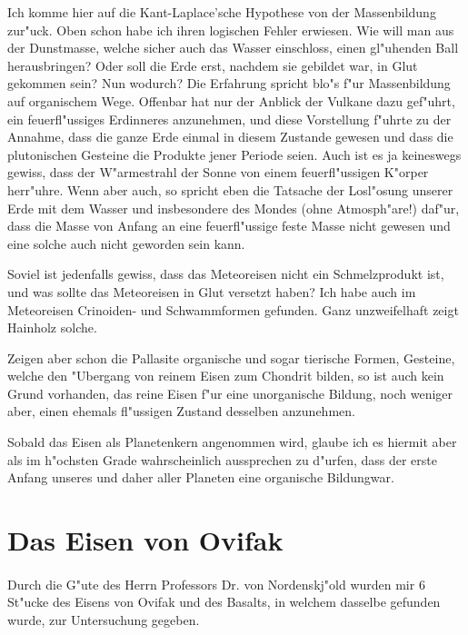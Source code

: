 \documentclass[a4paper, 11pt, oneside]{article}
\begin{document}
Ich komme hier auf die Kant-Laplace'sche Hypothese von der Massenbildung zur"uck. Oben schon habe ich ihren logischen Fehler erwiesen. Wie will man aus der Dunstmasse, welche sicher auch das Wasser einschloss, einen gl"uhenden Ball herausbringen? Oder soll die Erde erst, nachdem sie gebildet war, in Glut gekommen sein? Nun wodurch? Die Erfahrung spricht blo"s f"ur Massenbildung auf organischem Wege. Offenbar hat nur der Anblick der Vulkane dazu gef"uhrt, ein feuerfl"ussiges Erdinneres anzunehmen, und diese Vorstellung f"uhrte zu der Annahme, dass die ganze Erde einmal in diesem Zustande gewesen und dass die plutonischen Gesteine die Produkte jener Periode seien. Auch ist es ja keineswegs gewiss, dass der W"armestrahl der Sonne von einem feuerfl"ussigen K"orper herr"uhre. Wenn aber auch, so spricht eben die Tatsache der Losl"osung unserer Erde mit dem Wasser und insbesondere des Mondes (ohne Atmosph"are!) daf"ur, dass die Masse von Anfang an eine feuerfl"ussige feste Masse nicht gewesen und eine solche auch nicht geworden sein kann.

Soviel ist jedenfalls gewiss, dass das Meteoreisen nicht ein Schmelzprodukt ist, und was sollte das Meteoreisen in Glut versetzt haben? Ich habe auch im Meteoreisen Crinoiden- und Schwammformen gefunden. Ganz unzweifelhaft zeigt Hainholz solche.

Zeigen aber schon die Pallasite organische und sogar tierische Formen, Gesteine, welche den "Ubergang von reinem Eisen zum Chondrit bilden, so ist auch kein Grund vorhanden, das reine Eisen f"ur eine unorganische Bildung, noch weniger aber, einen ehemals fl"ussigen Zustand desselben anzunehmen.

Sobald das Eisen als Planetenkern angenommen wird, glaube ich es hiermit aber als im h"ochsten Grade wahrscheinlich aussprechen zu d"urfen, dass der erste Anfang unseres und daher aller Planeten eine organische Bildungwar.
\clearpage
\section{Das Eisen von Ovifak}
\paragraph{}
Durch die G"ute des Herrn Professors Dr. von Nordenskj"old wurden mir 6 St"ucke des Eisens von Ovifak und des Basalts, in welchem dasselbe gefunden wurde, zur Untersuchung gegeben.
\end{document}

